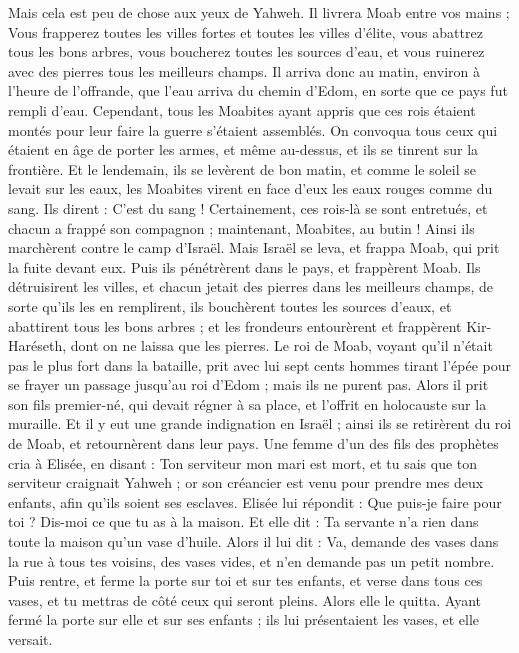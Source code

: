 \begin{multicols}{2}
Mais cela est peu de chose aux yeux de Yahweh. Il livrera Moab entre vos mains ;
Vous frapperez toutes les villes fortes et toutes les villes d’élite, vous abattrez tous les bons arbres, vous boucherez toutes les sources d’eau, et vous ruinerez avec des pierres tous les meilleurs champs.
Il arriva donc au matin, environ à l’heure de l’offrande, que l’eau arriva du chemin d’Edom, en sorte que ce pays fut rempli d’eau.
Cependant, tous les Moabites ayant appris que ces rois étaient montés pour leur faire la guerre s’étaient assemblés. On convoqua tous ceux qui étaient en âge de porter les armes, et même au-dessus, et ils se tinrent sur la frontière.
Et le lendemain, ils se levèrent de bon matin, et comme le soleil se levait sur les eaux, les Moabites virent en face d’eux les eaux rouges comme du sang.
Ils dirent : C’est du sang ! Certainement, ces rois-là se sont entretués, et chacun a frappé son compagnon ; maintenant, Moabites, au butin !
Ainsi ils marchèrent contre le camp d’Israël. Mais Israël se leva, et frappa Moab, qui prit la fuite devant eux. Puis ils pénétrèrent dans le pays, et frappèrent Moab.
Ils détruisirent les villes, et chacun jetait des pierres dans les meilleurs champs, de sorte qu’ils les en remplirent, ils bouchèrent toutes les sources d’eaux, et abattirent tous les bons arbres ; et les frondeurs entourèrent et frappèrent Kir-Haréseth, dont on ne laissa que les pierres.
Le roi de Moab, voyant qu’il n’était pas le plus fort dans la bataille, prit avec lui sept cents hommes tirant l’épée pour se frayer un passage jusqu’au roi d’Edom ; mais ils ne purent pas.
Alors il prit son fils premier-né, qui devait régner à sa place, et l’offrit en holocauste sur la muraille. Et il y eut une grande indignation en Israël ; ainsi ils se retirèrent du roi de Moab, et retournèrent dans leur pays.
\VerseOne{}Une femme d’un des fils des prophètes cria à Elisée, en disant : Ton serviteur mon mari est mort, et tu sais que ton serviteur craignait Yahweh ; or son créancier est venu pour prendre mes deux enfants, afin qu’ils soient ses esclaves.
Elisée lui répondit : Que puis-je faire pour toi ? Dis-moi ce que tu as à la maison. Et elle dit : Ta servante n’a rien dans toute la maison qu’un vase d’huile.
Alors il lui dit : Va, demande des vases dans la rue à tous tes voisins, des vases vides, et n’en demande pas un petit nombre.
Puis rentre, et ferme la porte sur toi et sur tes enfants, et verse dans tous ces vases, et tu mettras de côté ceux qui seront pleins.
Alors elle le quitta. Ayant fermé la porte sur elle et sur ses enfants ; ils lui présentaient les vases, et elle versait.

\end{multicols}
